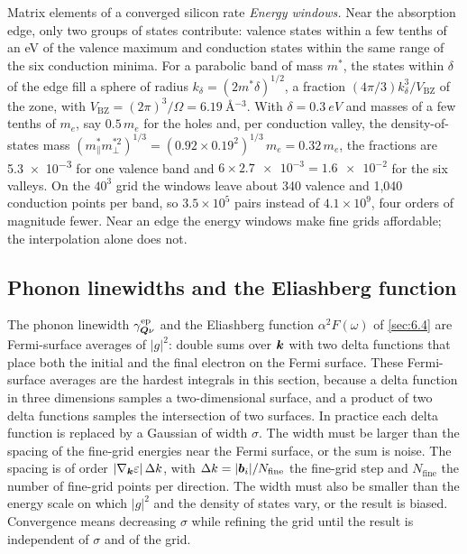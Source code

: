 \begin{workedexample}{Matrix elements of a converged silicon rate}
\emph{Energy windows.} Near the absorption edge, only two groups of states contribute: valence states within a few tenths of an eV of the valence maximum and conduction states within the same range of the six conduction minima. For a parabolic band of mass $m^*$, the states within $\delta$ of the edge fill a sphere of radius $k_\delta = (2m^*\delta)^{1/2}$, a fraction $(4\pi/3)k_\delta^3/V_{\mathrm{BZ}}$ of the zone, with $V_{\mathrm{BZ}} = (2\pi)^3/\Omega = \SI{6.19}{\angstrom^{-3}}$. With $\delta = \SI{0.3}{eV}$ and masses of a few tenths of $m_e$, say $0.5\,m_e$ for the holes and, per conduction valley, the density-of-states mass $(m^*_\parallel m^{*2}_\perp)^{1/3} = (0.92\times0.19^2)^{1/3}\,m_e = 0.32\,m_e$, the fractions are \num{5.3e-3} for one valence band and $6\times\num{2.7e-3} = \num{1.6e-2}$ for the six valleys. On the $40^3$ grid the windows leave about 340 valence and 1{,}040 conduction points per band, so $3.5\times10^5$ pairs instead of $4.1\times10^9$, four orders of magnitude fewer. Near an edge the energy windows make fine grids affordable; the interpolation alone does not.
\end{workedexample}

\subsection{Phonon linewidths and the Eliashberg function}

The phonon linewidth $\gamma^{\mathrm{ep}}_{\bm{Q}\nu}$ and the Eliashberg function $\alpha^2F(\omega)$ of \cref{sec:6.4} are Fermi-surface averages of $|g|^2$: double sums over $\bm{k}$ with two delta functions that place both the initial and the final electron on the Fermi surface. These Fermi-surface averages are the hardest integrals in this section, because a delta function in three dimensions samples a two-dimensional surface, and a product of two delta functions samples the intersection of two surfaces. In practice each delta function is replaced by a Gaussian of width $\sigma$. The width must be larger than the spacing of the fine-grid energies near the Fermi surface, or the sum is noise. The spacing is of order $|\nabla_{\bm{k}}\varepsilon|\,\Delta k$, with $\Delta k = |\bm{b}_i|/N_{\mathrm{fine}}$ the fine-grid step and $N_{\mathrm{fine}}$ the number of fine-grid points per direction. The width must also be smaller than the energy scale on which $|g|^2$ and the density of states vary, or the result is biased. Convergence means decreasing $\sigma$ while refining the grid until the result is independent of $\sigma$ and of the grid.

